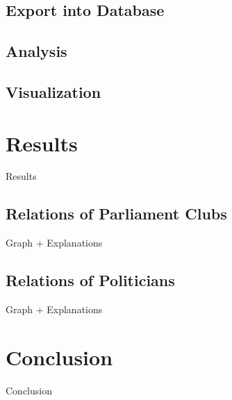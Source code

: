\documentclass[12pt]{report}
\begin{document}
\section{Export into Database}

\section{Analysis}

\section{Visualization}

\chapter{Results}
Results

\section{Relations of Parliament Clubs}
Graph + Explanations

\section{Relations of Politicians}
Graph + Explanations

\chapter{Conclusion}
Conclusion

 

\end{document}
